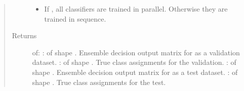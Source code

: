 \documentclass[letterpaper,10pt,english]{sphinxmanual}
\begin{document}
\begin{fulllineitems}
\begin{quote}
\begin{description}
\begin{itemize}
\item {} 
\sphinxAtStartPar
{} \textendash{} If , all classifiers are trained in parallel. Otherwise they are trained in sequence.

\end{itemize}

\item[{Returns}] \leavevmode
\sphinxAtStartPar
{} of:
\sphinxhyphen{} :  of shape . Ensemble decision output matrix for
as a validation dataset.
\sphinxhyphen{} :  of shape . True class assignments for the validation.
\sphinxhyphen{} :  of shape . Ensemble decision output matrix for
as a test dataset.
\sphinxhyphen{} :  of shape . True class assignments for the test.

\end{description}\end{quote}

\end{fulllineitems}

\end{document}
